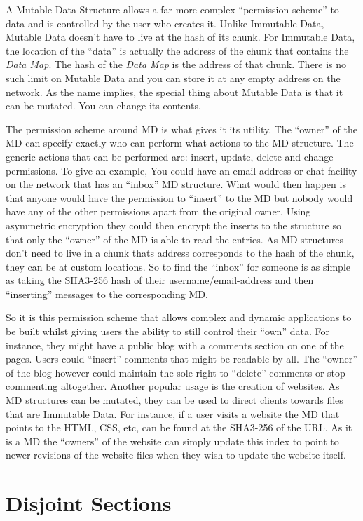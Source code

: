 A Mutable Data Structure allows a far more complex ``permission scheme'' to data and is controlled by the user who creates it. Unlike Immutable Data, Mutable Data doesn't have to live at the hash of its chunk. For Immutable Data, the location of the ``data'' is actually the address of the chunk that contains the \textit{Data Map}. The hash of the \textit{Data Map} is the address of that chunk. There is no such limit on Mutable Data and you can store it at any empty address on the network. As the name implies, the special thing about Mutable Data is that it can be mutated. You can change its contents.

The permission scheme around MD is what gives it its utility. The ``owner'' of the MD can specify exactly who can perform what actions to the MD structure. The generic actions that can be performed are: insert, update, delete and change permissions. To give an example, You could have an email address or chat facility on the network that has an ``inbox'' MD structure. What would then happen is that anyone would have the permission to ``insert'' to the MD but nobody would have any of the other permissions apart from the original owner. Using asymmetric encryption they could then encrypt the inserts to the structure so that only the ``owner'' of the MD is able to read the entries. As MD structures don't need to live in a chunk thats address corresponds to the hash of the chunk, they can be at custom locations. So to find the ``inbox'' for someone is as simple as taking the SHA3-256 hash of their username/email-address and then ``inserting'' messages to the corresponding MD.

So it is this permission scheme that allows complex and dynamic applications to be built whilst giving users the ability to still control their ``own'' data. For instance, they might have a public blog with a comments section on one of the pages. Users could ``insert'' comments that might be readable by all. The ``owner'' of the blog however could maintain the sole right to ``delete'' comments or stop commenting altogether. Another popular usage is the creation of websites. As MD structures can be mutated, they can be used to direct clients towards files that are Immutable Data. For instance, if a user visits a website the MD that points to the HTML, CSS, etc, can be found at the SHA3-256 of the URL. As it is a MD the ``owners'' of the website can simply update this index to point to newer revisions of the website files when they wish to update the website itself.

\section{Disjoint Sections}

